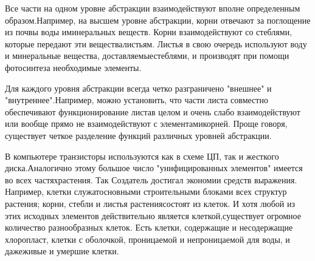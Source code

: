\documentclass[10pt]{article}
\begin{document}
Все части на одном уровне абстракции взаимодействуют вполне определенным образом.\linebreak Например, на высшем уровне абстракции, корни отвечают за поглощение из почвы воды и\linebreak минеральных веществ. Корни взаимодействуют со стеблями, которые передают эти вещества\linebreak листьям. Листья в свою очередь используют воду и минеральные вещества, доставляемые\linebreak стеблями, и производят при помощи фотосинтеза необходимые элементы. \vspace{3mm}

Для каждого уровня абстракции всегда четко разграничено "внешнее" и "внутреннее".\linebreak Например, можно установить, что части листа совместно обеспечивают функционирование листа\linebreak в целом и очень слабо взаимодействуют или вообще прямо не взаимодействуют с элементами\linebreak корней. Проще говоря, существует четкое разделение функций различных уровней абстракции. \vspace{3mm}

В компьютере транзисторы используются как в схеме ЦП, так и жесткого диска.\linebreak Аналогично этому большое число "унифицированных элементов" имеется во всех частях\linebreak растения. Так Создатель достигал экономии средств выражения. Например, клетки служат\linebreak основными строительными блоками всех структур растения; корни, стебли и листья растения\linebreak состоят из клеток. И хотя любой из этих исходных элементов действительно является клеткой,\linebreak существует огромное количество разнообразных клеток. Есть клетки, содержащие и не\linebreak содержащие хлоропласт, клетки с оболочкой, проницаемой и непроницаемой для воды, и даже\linebreak живые и умершие клетки. \vspace{3mm}
\end{document}
